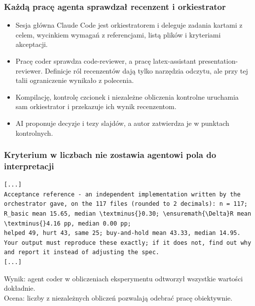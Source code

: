 
\begin{frame}
  \frametitle{Każdą pracę agenta sprawdzał recenzent i orkiestrator}
  \begin{itemize}
    \item Sesja główna Claude Code jest orkiestratorem i deleguje zadania
      kartami z celem, wycinkiem wymagań z referencjami, listą plików
      i kryteriami akceptacji.
    \item Pracę coder sprawdza code-reviewer, a pracę latex-assistant
      presentation-reviewer. Definicje ról recenzentów dają tylko narzędzia
      odczytu, ale przy tej talii ograniczenie wynikało z polecenia.
    \item Kompilację, kontrolę czcionek i niezależne obliczenia kontrolne
      uruchamia sam orkiestrator i przekazuje ich wynik recenzentom.
    \item AI proponuje decyzje i tezy slajdów, a autor zatwierdza je
      w punktach kontrolnych.
  \end{itemize}
\end{frame}

\begin{frame}[fragile]
  \frametitle{Kryterium w liczbach nie zostawia agentowi pola do interpretacji}
\begin{Verbatim}[commandchars=\\\{\},fontsize=\footnotesize]
[...]
Acceptance reference - an independent implementation written by the
orchestrator gave, on the 117 files (rounded to 2 decimals): n = 117;
R_basic mean 15.65, median \textminus{}0.30; \ensuremath{\Delta}R mean \textminus{}4.16 pp, median 0.00 pp;
helped 49, hurt 43, same 25; buy-and-hold mean 43.33, median 14.95.
Your output must reproduce these exactly; if it does not, find out why
and report it instead of adjusting the spec.
[...]
\end{Verbatim}
  \vskip1mm
  Wynik: agent coder w obliczeniach eksperymentu odtworzył wszystkie wartości dokładnie.\\
  Ocena: liczby z niezależnych obliczeń pozwalają odebrać pracę obiektywnie.
\end{frame}
